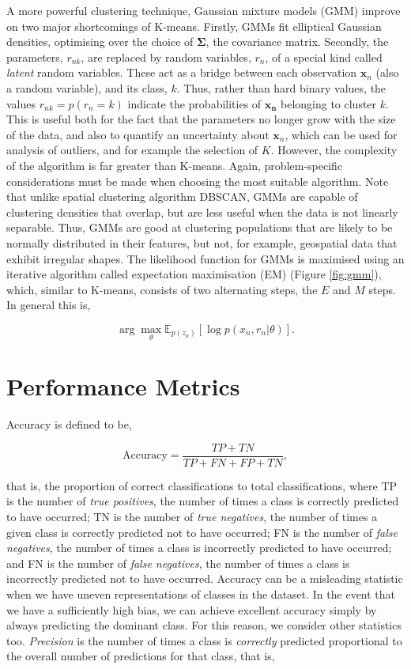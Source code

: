 \documentclass[11pt]{amsart}
\begin{document}
A more powerful clustering technique, Gaussian mixture models (GMM) improve on two major shortcomings of K-means. Firstly, GMMs fit elliptical Gaussian densities, optimising over the choice of $\boldsymbol\Sigma$, the covariance matrix. Secondly, the parameters, $r_{nk}$, are replaced by random variables, $r_n$, of a special kind called \emph{latent} random variables. These act as a bridge between each observation $\mathbf{x}_n$ (also a random variable), and its class, $k$. Thus, rather than hard binary values, the values $r_{nk} = p(r_n = k)$ indicate the probabilities of $\mathbf{x_n}$ belonging to cluster $k$. This is useful both for the fact that the parameters no longer grow with the size of the data, and also to quantify an uncertainty about $\mathbf{x}_n$, which can be used for analysis of outliers, and for example the selection of $K$. However, the complexity of the algorithm is far greater than K-means. Again, problem-specific considerations must be made when choosing the most suitable algorithm. Note that unlike spatial clustering algorithm DBSCAN, GMMs are capable of clustering densities that overlap, but are less useful when the data is not linearly separable. Thus, GMMs are good at clustering populations that are likely to be normally distributed in their features, but not, for example, geospatial data that exhibit irregular shapes. The likelihood function for GMMs is maximised using an iterative algorithm called expectation maximisation (EM) (Figure \ref{fig:gmm}), which, similar to K-means, consists of two alternating steps, the $E$ and $M$ steps. In general this is,

$$\arg \max_\theta \mathbb{E}_{p(z_n)}[\log p(x_n, r_n | \theta)].$$

\section{Performance Metrics}

Accuracy is defined to be,

$$
\text{Accuracy} = \frac{TP + TN}{TP + FN + FP + TN},
$$

that is, the proportion of correct classifications to total classifications, where TP is the number of \emph{true positives}, the number of times a class is correctly predicted to have occurred; TN is the number of \emph{true negatives}, the number of times a given class is correctly predicted not to have occurred; FN is the number of \emph{false negatives}, the number of times a class is incorrectly predicted to have occurred; and FN is the number of \emph{false negatives}, the number of times a class is incorrectly predicted not to have occurred. Accuracy can be a misleading statistic when we have uneven representations of classes in the dataset. In the event that we have a sufficiently high bias, we can achieve excellent accuracy simply by always predicting the dominant class. For this reason, we consider other statistics too. \emph{Precision} is the number of times a class is \emph{correctly} predicted proportional to the overall number of predictions for that class, that is,
\end{document}
